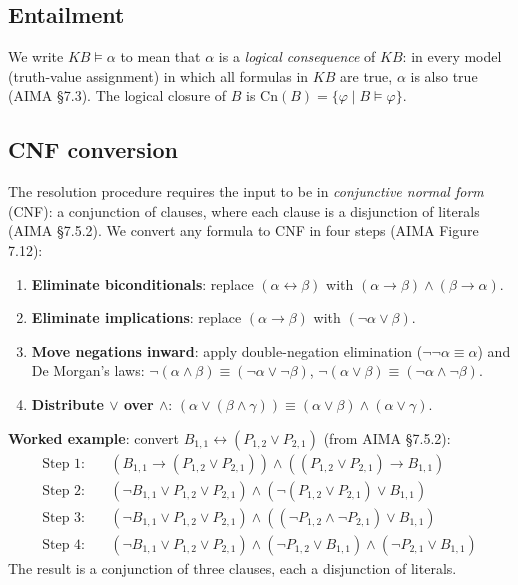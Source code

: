 \documentclass[11pt,a4paper]{article}
\newcommand{\Cn}{\mathrm{Cn}}
\newcommand{\entails}{\models}
\newcommand{\lneg}{\neg}
\begin{document}
\subsection{Entailment}

We write $\mathit{KB} \entails \alpha$ to mean that $\alpha$ is a \emph{logical
consequence} of $\mathit{KB}$: in every model (truth-value assignment) in which
all formulas in $\mathit{KB}$ are true, $\alpha$ is also true (AIMA §7.3).
The logical closure of $B$ is $\Cn(B) = \{\varphi \mid B \entails \varphi\}$.

\subsection{CNF conversion}

The resolution procedure requires the input to be in
\emph{conjunctive normal form} (CNF): a conjunction of clauses, where each
clause is a disjunction of literals (AIMA §7.5.2).
We convert any formula to CNF in four steps (AIMA Figure 7.12):

\begin{enumerate}[noitemsep]
  \item \textbf{Eliminate biconditionals}: replace $(\alpha \leftrightarrow \beta)$
        with $(\alpha \to \beta) \land (\beta \to \alpha)$.
  \item \textbf{Eliminate implications}: replace $(\alpha \to \beta)$
        with $(\lneg\alpha \lor \beta)$.
  \item \textbf{Move negations inward}: apply double-negation elimination
        ($\lneg\lneg\alpha \equiv \alpha$) and De Morgan's laws:
        $\lneg(\alpha \land \beta) \equiv (\lneg\alpha \lor \lneg\beta)$,\quad
        $\lneg(\alpha \lor \beta) \equiv (\lneg\alpha \land \lneg\beta)$.
  \item \textbf{Distribute $\lor$ over $\land$}:
        $(\alpha \lor (\beta \land \gamma)) \equiv
         (\alpha \lor \beta) \land (\alpha \lor \gamma)$.
\end{enumerate}

\textbf{Worked example}: convert $B_{1,1} \leftrightarrow (P_{1,2} \lor P_{2,1})$
(from AIMA §7.5.2):
\begin{align*}
\text{Step 1:} &\quad (B_{1,1} \to (P_{1,2} \lor P_{2,1})) \land
                       ((P_{1,2} \lor P_{2,1}) \to B_{1,1}) \\
\text{Step 2:} &\quad (\lneg B_{1,1} \lor P_{1,2} \lor P_{2,1}) \land
                       (\lneg(P_{1,2} \lor P_{2,1}) \lor B_{1,1}) \\
\text{Step 3:} &\quad (\lneg B_{1,1} \lor P_{1,2} \lor P_{2,1}) \land
                       ((\lneg P_{1,2} \land \lneg P_{2,1}) \lor B_{1,1}) \\
\text{Step 4:} &\quad (\lneg B_{1,1} \lor P_{1,2} \lor P_{2,1}) \land
                       (\lneg P_{1,2} \lor B_{1,1}) \land (\lneg P_{2,1} \lor B_{1,1})
\end{align*}
The result is a conjunction of three clauses, each a disjunction of literals.
\end{document}
